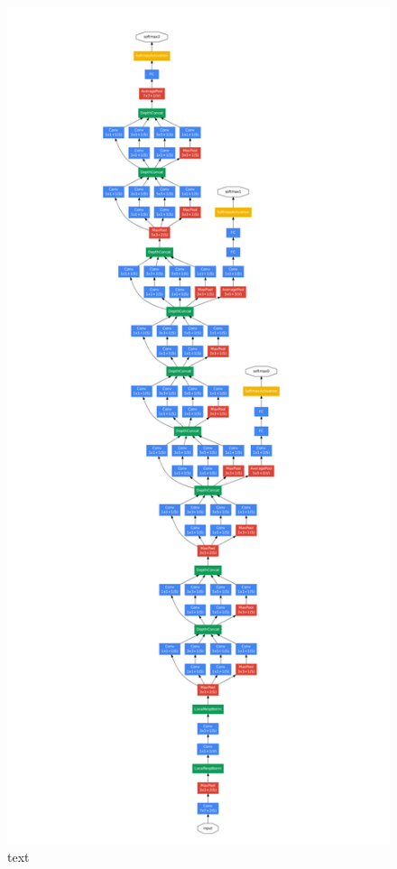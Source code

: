 \documentclass[10pt,journal,compsoc]{IEEEtran}
\begin{document}
		
		\clearpage
		\begin{figure}[h]
			\centering
			\includegraphics[scale=1]{googlenet_arch}
			\caption{text}
		\end{figure}
		\clearpage
		
\end{document}
